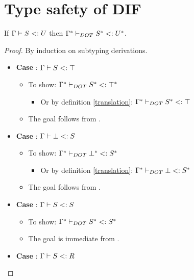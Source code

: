 \section{Type safety of DIF}

\begin{LEMMA}
    \label{pres_subtyping}
    If $\Gamma \vdash S <: U$ then $\Gamma^{*} \vdash_{DOT} S^{*} <: U^{*}$.
\end{LEMMA}

\begin{proof}
    By induction on subtyping derivations.
    \begin{itemize}
        \item \textbf{Case} : $\Gamma \vdash S <: \top$
        \begin{itemize}
            \item To show: $\Gamma^{*} \vdash_{DOT} S^{*} <: \top^{*}$
            \begin{itemize}
                \item Or by definition \ref{translation}:
                    $\Gamma^{*} \vdash_{DOT} S^{*} <: \top$
            \end{itemize}
            \item The goal follows from .
        \end{itemize}
        \item \textbf{Case} : $\Gamma \vdash \bot <: S$
        \begin{itemize}
            \item To show: $\Gamma^{*} \vdash_{DOT} \bot^{*} <: S^{*}$
            \begin{itemize}
                \item Or by definition \ref{translation}:
                    $\Gamma^{*} \vdash_{DOT} \bot <: S^{*}$
            \end{itemize}
            \item The goal follows from .
        \end{itemize}
        \item \textbf{Case} : $\Gamma \vdash S <: S$
        \begin{itemize}
            \item To show: $\Gamma^{*} \vdash_{DOT} S^{*} <: S^{*}$
            \item The goal is immediate from .
        \end{itemize}
        \item \textbf{Case} : $\Gamma \vdash S <: R$

\end{itemize}
\end{proof}
